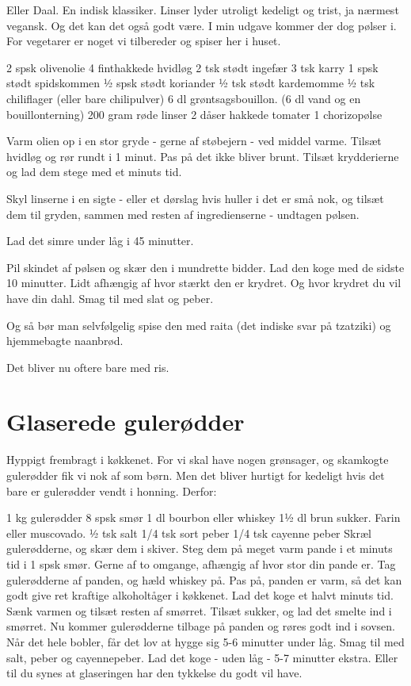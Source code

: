 \documentclass[
  letterpaper,
  DIV=11,
  numbers=noendperiod]{scrreprt}
\begin{document}
Eller Daal. En indisk klassiker. Linser lyder utroligt kedeligt og
trist, ja nærmest vegansk. Og det kan det også godt være. I min udgave
kommer der dog pølser i. For vegetarer er noget vi tilbereder og spiser
her i huset.

2 spsk olivenolie 4 finthakkede hvidløg 2 tsk stødt ingefær 3 tsk karry
1 spsk stødt spidskommen ½ spsk stødt koriander ½ tsk stødt kardemomme ½
tsk chiliflager (eller bare chilipulver) 6 dl grøntsagsbouillon. (6 dl
vand og en bouillonterning) 200 gram røde linser 2 dåser hakkede tomater
1 chorizopølse

Varm olien op i en stor gryde - gerne af støbejern - ved middel varme.
Tilsæt hvidløg og rør rundt i 1 minut. Pas på det ikke bliver brunt.
Tilsæt krydderierne og lad dem stege med et minuts tid.

Skyl linserne i en sigte - eller et dørslag hvis huller i det er små
nok, og tilsæt dem til gryden, sammen med resten af ingredienserne -
undtagen pølsen.

Lad det simre under låg i 45 minutter.

Pil skindet af pølsen og skær den i mundrette bidder. Lad den koge med
de sidste 10 minutter. Lidt afhængig af hvor stærkt den er krydret. Og
hvor krydret du vil have din dahl. Smag til med slat og peber.

Og så bør man selvfølgelig spise den med raita (det indiske svar på
tzatziki) og hjemmebagte naanbrød.

Det bliver nu oftere bare med ris.

\hypertarget{glaserede-guleruxf8dder}{%
\section{Glaserede gulerødder}\label{glaserede-guleruxf8dder}}

Hyppigt frembragt i køkkenet. For vi skal have nogen grønsager, og
skamkogte gulerødder fik vi nok af som børn. Men det bliver hurtigt for
kedeligt hvis det bare er gulerødder vendt i honning. Derfor:

1 kg gulerødder 8 spsk smør 1 dl bourbon eller whiskey 1½ dl brun
sukker. Farin eller muscovado. ½ tsk salt 1/4 tsk sort peber 1/4 tsk
cayenne peber Skræl gulerødderne, og skær dem i skiver. Steg dem på
meget varm pande i et minuts tid i 1 spsk smør. Gerne af to omgange,
afhængig af hvor stor din pande er. Tag gulerødderne af panden, og hæld
whiskey på. Pas på, panden er varm, så det kan godt give ret kraftige
alkoholtåger i køkkenet. Lad det koge et halvt minuts tid. Sænk varmen
og tilsæt resten af smørret. Tilsæt sukker, og lad det smelte ind i
smørret. Nu kommer gulerødderne tilbage på panden og røres godt ind i
sovsen. Når det hele bobler, får det lov at hygge sig 5-6 minutter under
låg. Smag til med salt, peber og cayennepeber. Lad det koge - uden låg -
5-7 minutter ekstra. Eller til du synes at glaseringen har den tykkelse
du godt vil have.
\end{document}
